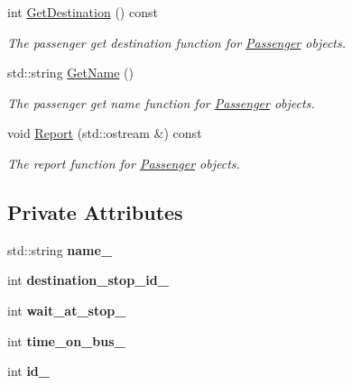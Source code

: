 \begin{DoxyCompactItemize}
int \hyperlink{classPassenger_a49db0ee527377aae6077df190a11501c}{Get\+Destination} () const
\begin{DoxyCompactList}\small\item\em The passenger get destination function for \hyperlink{classPassenger}{Passenger} objects. \end{DoxyCompactList}\item 
std\+::string \hyperlink{classPassenger_ad186ef0e9d198895eaa2b14c66869e2b}{Get\+Name} ()
\begin{DoxyCompactList}\small\item\em The passenger get name function for \hyperlink{classPassenger}{Passenger} objects. \end{DoxyCompactList}\item 
void \hyperlink{classPassenger_aee3f9d7f6f2a848034971559faf65248}{Report} (std\+::ostream \&) const
\begin{DoxyCompactList}\small\item\em The report function for \hyperlink{classPassenger}{Passenger} objects. \end{DoxyCompactList}\end{DoxyCompactItemize}
\subsection*{Private Attributes}
\begin{DoxyCompactItemize}
\item 
\mbox{\label{classPassenger_a97a4a76f73532809a8c92fcccd126441}} 
std\+::string {\bfseries name\+\_\+}
\item 
\mbox{\label{classPassenger_a88f749669b2e642554c191f90a3ad3ff}} 
int {\bfseries destination\+\_\+stop\+\_\+id\+\_\+}
\item 
\mbox{\label{classPassenger_a91bdd12e81993d7b9987a4a58d5d4f13}} 
int {\bfseries wait\+\_\+at\+\_\+stop\+\_\+}
\item 
\mbox{\label{classPassenger_a2fb16451ba99fd11739fa61a2a9e034f}} 
int {\bfseries time\+\_\+on\+\_\+bus\+\_\+}
\item 
\mbox{\label{classPassenger_a99fb191c2b50c78501160ee675099be0}} 
int {\bfseries id\+\_\+}
\end{DoxyCompactItemize}
